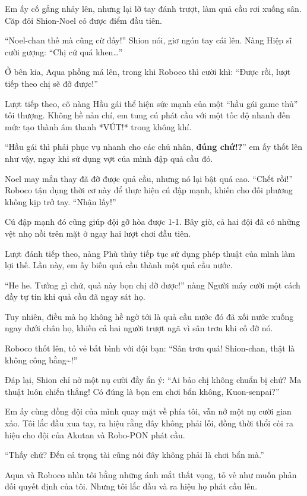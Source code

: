 \documentclass[../main.tex]{subfiles}
\begin{document}
Em ấy cố gắng nhảy lên, nhưng lại lỡ tay đánh trượt, làm quả cầu rơi xuống sân. Căp đôi Shion-Noel có được điểm đầu tiên.

``Noel-chan thế mà cũng cừ đấy!'' Shion nói, giơ ngón tay cái lên. Nàng Hiệp sĩ cười gượng: ``Chị cứ quá khen\dots''

Ở bên kia, Aqua phồng má lên, trong khi Roboco thì cười khì: ``Được rồi, lượt tiếp theo chị sẽ đỡ được!''

Lượt tiếp theo, cô nàng Hầu gái thể hiện sức mạnh của một ``hầu gái game thủ'' tối thượng. Không hề nản chí, em tung cú phát cầu với một tốc độ nhanh đến mức tạo thành âm thanh *VÚT!* trong không khí.

``Hầu gái thì phải phục vụ nhanh cho các chủ nhân, \textbf{đúng chứ!?}'' em ấy thốt lên như vậy, ngay khi sử dụng vợt của mình đập quả cầu đó.

Noel may mắn thay đã đỡ được quả cầu, nhưng nó lại bật quá cao. ``Chết rồi!'' Roboco tận dụng thời cơ này để thực hiện cú đập mạnh, khiến cho đối phương không kịp trở tay. ``Nhận lấy!''

Cú đập mạnh đó cũng giúp đội gỡ hòa được 1-1. Bây giờ, cả hai đội đã có những vệt nhọ nồi trên mặt ở ngay hai lượt chơi đầu tiên.

Lượt đánh tiếp theo, nàng Phù thủy tiếp tục sử dụng phép thuật của mình làm lợi thế. Lần này, em ấy biến quả cầu thành một quả cầu nước.

``He he. Tưởng gì chứ, quả này bọn chị đỡ được!'' nàng Người máy cười một cách đầy tự tin khi quả cầu đã ngay sát họ.

Tuy nhiên, điều mà họ không hề ngờ tới là quả cầu nước đó đã xối nước xuống ngay dưới chân họ, khiến cả hai người trượt ngã vì sân trơn khi cố đỡ nó.

Roboco thốt lên, tỏ vẻ bất bình với đội bạn: ``Sân trơn quá! Shion-chan, thật là không công bằng\~{}!''

Đáp lại, Shion chỉ nở một nụ cười đầy ẩn ý: ``Ai bảo chị không chuẩn bị chứ? Ma thuật luôn chiến thắng! Có đúng là bọn em chơi bẩn không, Kuon-senpai?''

Em ấy cùng đồng đội của mình quay mặt về phía tôi, vẫn nở một nụ cười gian xảo. Tôi lắc đầu xua tay, ra hiệu rằng đây không phải lỗi, đồng thời thổi còi ra hiệu cho đội của Akutan và Robo-PON phát cầu.

``Thấy chứ? Đến cả trọng tài cũng nói đây không phải là chơi bẩn mà.''

Aqua và Roboco nhìn tôi bằng những ánh mắt thất vọng, tỏ vẻ như muốn phản đối quyết định của tôi. Nhưng tôi lắc đầu và ra hiệu họ phát cầu lên.
\end{document}

